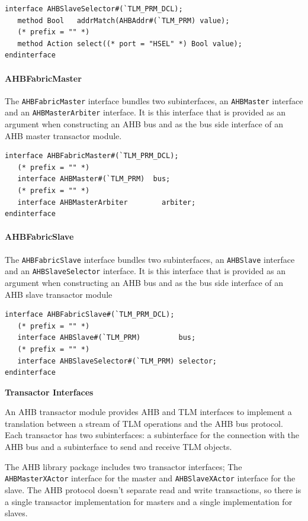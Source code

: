 \documentclass[twoside,letterpaper]{article}
\newcommand{\te}[1]{\texttt{#1}}
\begin{document}
\begin{verbatim}
interface AHBSlaveSelector#(`TLM_PRM_DCL);
   method Bool   addrMatch(AHBAddr#(`TLM_PRM) value);
   (* prefix = "" *)
   method Action select((* port = "HSEL" *) Bool value);
endinterface
\end{verbatim}

\paragraph{\bf AHBFabricMaster} The \te{AHBFabricMaster} interface 
bundles two subinterfaces, an \te{AHBMaster} interface and an
\te{AHBMasterArbiter} interface.  It is this interface that is 
provided as an argument when constructing an AHB bus and as the bus
side interface of an AHB master transactor module.

\begin{verbatim}
interface AHBFabricMaster#(`TLM_PRM_DCL);
   (* prefix = "" *)
   interface AHBMaster#(`TLM_PRM)  bus;
   (* prefix = "" *)
   interface AHBMasterArbiter        arbiter;
endinterface
\end{verbatim}

\paragraph{\bf AHBFabricSlave} The \te{AHBFabricSlave} interface 
bundles two subinterfaces, an \te{AHBSlave} interface and an
\te{AHBSlaveSelector} interface.  It is this interface that is 
provided as an argument when constructing an AHB bus and as the bus
side interface of an AHB slave transactor module

\begin{verbatim}
interface AHBFabricSlave#(`TLM_PRM_DCL);
   (* prefix = "" *)
   interface AHBSlave#(`TLM_PRM)         bus;
   (* prefix = "" *)
   interface AHBSlaveSelector#(`TLM_PRM) selector;
endinterface
\end{verbatim}

{\bf Transactor Interfaces}

An AHB transactor module provides AHB and TLM interfaces to implement
a translation between a stream of TLM operations and the AHB bus
protocol.  Each transactor has two subinterfaces: a subinterface for
the connection with the AHB bus and a subinterface to send and receive
TLM objects.

The AHB library package includes two transactor interfaces; The 
\te{AHBMasterXActor} interface for the master and \te{AHBSlaveXActor} 
interface for the slave.  The AHB protocol doesn't separate read and
write transactions, so there is a single transactor implementation for
masters and a single implementation for slaves.
\end{document}

